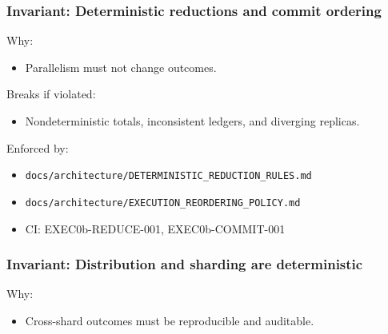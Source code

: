 \documentclass[9pt,a4paper,openany]{book}
\begin{document}
\subsubsection{Invariant: Deterministic reductions and commit ordering}


Why:



\begin{itemize}
\item Parallelism must not change outcomes.\allowbreak{}
\end{itemize}


Breaks if violated:



\begin{itemize}
\item Nondeterministic totals, inconsistent ledgers, and diverging replicas.\allowbreak{}
\end{itemize}


Enforced by:



\begin{itemize}
\item \texttt{docs/\allowbreak{}architecture/\allowbreak{}DETERMINISTIC\_\allowbreak{}REDUCTION\_\allowbreak{}RULES.\allowbreak{}md}
\end{itemize}


\begin{itemize}
\item \texttt{docs/\allowbreak{}architecture/\allowbreak{}EXECUTION\_\allowbreak{}REORDERING\_\allowbreak{}POLICY.\allowbreak{}md}
\end{itemize}


\begin{itemize}
\item CI: EXEC0b-\allowbreak{}REDUCE-\allowbreak{}001, EXEC0b-\allowbreak{}COMMIT-\allowbreak{}001
\end{itemize}





\subsubsection{Invariant: Distribution and sharding are deterministic}


Why:



\begin{itemize}
\item Cross-\allowbreak{}shard outcomes must be reproducible and auditable.\allowbreak{}
\end{itemize}
\end{document}
